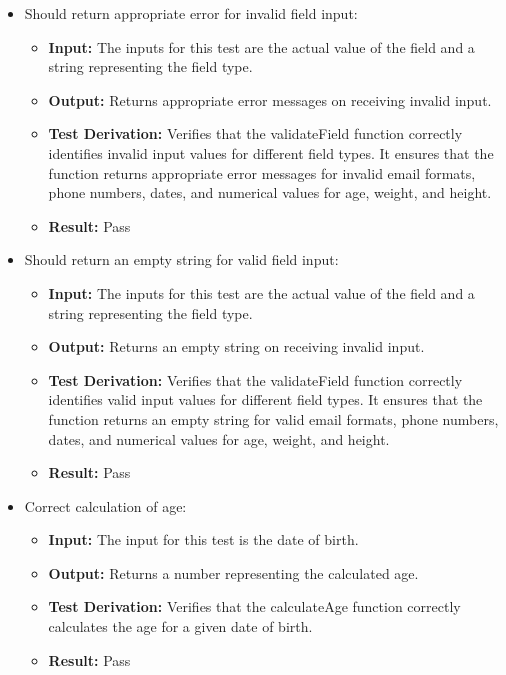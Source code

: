 \documentclass[12pt, titlepage]{article}
\begin{document}
  \begin{itemize}
    \item Should return appropriate error for invalid field input:
      \begin{itemize}
        \item \textbf{Input:} The inputs for this test are the actual value of the field and a string representing the field type.   
        \item \textbf{Output:} Returns appropriate error messages on receiving invalid input.
        \item \textbf{Test Derivation:} Verifies that the validateField function correctly identifies invalid input values for different field types. It ensures that the function returns appropriate error messages for invalid email formats, phone numbers, dates, and numerical values for age, weight, and height.
        \item \textbf{Result:} Pass
      \end{itemize}

    \item Should return an empty string for valid field input:
      \begin{itemize}
        \item \textbf{Input:} The inputs for this test are the actual value of the field and a string representing the field type.   
        \item \textbf{Output:} Returns an empty string on receiving invalid input.
        \item \textbf{Test Derivation:} Verifies that the validateField function correctly identifies valid input values for different field types. It ensures that the function returns an empty string for valid email formats, phone numbers, dates, and numerical values for age, weight, and height.
        \item \textbf{Result:} Pass
      \end{itemize}

    \item Correct calculation of age:
      \begin{itemize}
        \item \textbf{Input:} The input for this test is the date of birth.    
        \item \textbf{Output:} Returns a number representing the calculated age.
        \item \textbf{Test Derivation:} Verifies that the calculateAge function correctly calculates the age for a given date of birth.
        \item \textbf{Result:} Pass
      \end{itemize}


\end{itemize}
\end{document}
